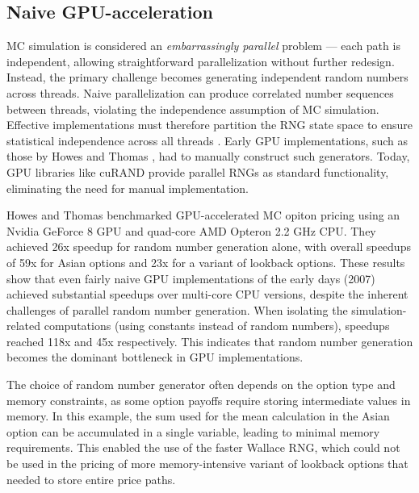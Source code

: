 \documentclass[english,12pt,a4paper,pdftex,sci,utf8]{aaltothesis}
\begin{document}
\subsection{Naive GPU-acceleration}
MC simulation is considered an \emph{embarrassingly parallel} problem --- each path is independent, allowing straightforward parallelization without further redesign. Instead, the primary challenge becomes generating independent random numbers across threads. Naive parallelization can produce correlated number sequences between threads, violating the independence assumption of MC simulation. Effective implementations must therefore partition the RNG state space to ensure statistical independence across all threads \cite{gentle2003random}. Early GPU implementations, such as those by Howes and Thomas \cite{nguyen2007gpu}, had to manually construct such generators. Today, GPU libraries like cuRAND \cite{curand2025} provide parallel RNGs as standard functionality, eliminating the need for manual implementation.

Howes and Thomas \cite{nguyen2007gpu} benchmarked GPU-accelerated MC opiton pricing using an Nvidia GeForce 8 GPU and quad-core AMD Opteron 2.2 GHz CPU. They achieved 26x speedup for random number generation alone, with overall speedups of 59x for Asian options and 23x for a variant of lookback options. These results show that even fairly naive GPU implementations of the early days (2007) achieved substantial speedups over multi-core CPU versions, despite the inherent challenges of parallel random number generation. When isolating the simulation-related computations (using constants instead of random numbers), speedups reached 118x and 45x respectively. This indicates that random number generation becomes the dominant bottleneck in GPU implementations. 

The choice of random number generator often depends on the option type and memory constraints, as some option payoffs require storing intermediate values in memory. In this example, the sum used for the mean calculation in the Asian option can be accumulated in a single variable, leading to minimal memory requirements. This enabled the use of the faster Wallace RNG, which could not be used in the pricing of more memory-intensive variant of lookback options that needed to store entire price paths.
\end{document}
